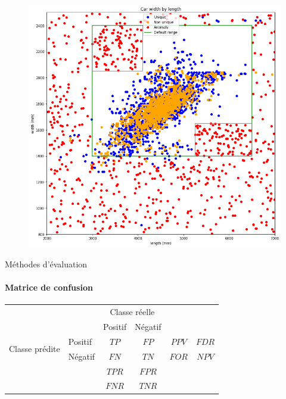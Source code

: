 \documentclass[usenames,dvipsnames]{beamer}
\begin{document}
\begin{frame}
\begin{figure}
\centering
\includegraphics[width=.8\textwidth]{img/first_try.png}
\end{figure}
\end{frame}

\begin{frame}{Méthodes d'évaluation}
\framesubtitle{Matrice de confusion}

\begin{tabular}{ l | l | c | c | c c}
\multicolumn{2}{c}{} & \multicolumn{2}{c}{Classe réelle} & \\
\cline{3-4}
\multicolumn{2}{c|}{} & Positif & Négatif \\
\cline{2-4}
\multirow{2}{*}{Classe prédite} & Positif & $TP$ & $FP$ & $PPV$ & $FDR$ \\
\cline{2-4}
& Négatif & $FN$ & $TN$ & $FOR$ & $NPV$ \\
\cline{2-4}
\multicolumn{1}{r}{} & \multicolumn{1}{l}{} & \multicolumn{1}{c}{$TPR$} & \multicolumn{1}{c}{$FPR$} \\
\multicolumn{1}{l}{} & \multicolumn{1}{l}{} & \multicolumn{1}{c}{$FNR$} & \multicolumn{1}{c}{$TNR$} \\
\end{tabular}

\end{frame}
\end{document}
